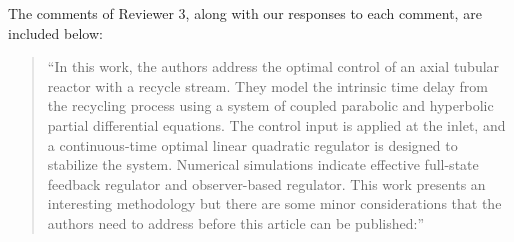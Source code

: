 \documentclass[12pt,answers]{exam}
\begin{document}
The comments of Reviewer 3, along with our responses to each comment, are included below:

\begin{quote}
    ``In this work, the authors address the optimal control of an axial tubular reactor with a recycle stream. They model the intrinsic time delay from the recycling process using a system of coupled parabolic and hyperbolic partial differential equations. The control input is applied at the inlet, and a continuous-time optimal linear quadratic regulator is designed to stabilize the system. Numerical simulations indicate effective full-state feedback regulator and observer-based regulator. This work presents an interesting methodology but there are some minor considerations that the authors need to address before this article can be published:''
\end{quote}
\end{document}
